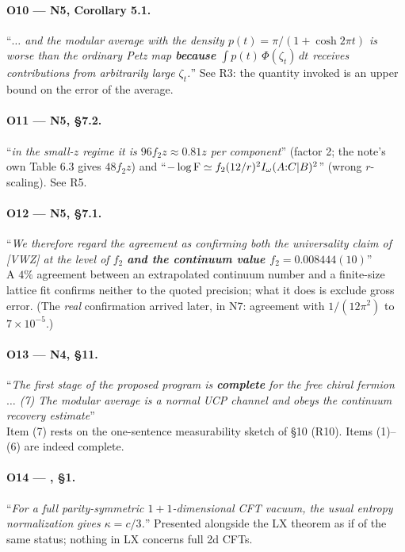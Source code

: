 \documentclass[11pt]{article}
\newcommand{\NIV}{N4}\newcommand{\NV}{N5}\newcommand{\NVI}{N6}\newcommand{\NVII}{N7}
\newcommand{\zz}{\zeta}
\begin{document}
\paragraph{O10 --- \NV, Corollary 5.1. }
``\emph{$\dots$ and the modular average with the density $p(t)=\pi/(1+\cosh2\pi t)$ is worse than the ordinary Petz
map \textbf{because} $\int p(t)\,\Phi(\zz_t)\,dt$ receives contributions from arbitrarily large $\zz_t$.}''
See R3: the quantity invoked is an upper bound on the error of the average.

\paragraph{O11 --- \NV, \S7.2. }
``\emph{in the small-$z$ regime it is $96f_2z\approx0.81z$ per component}'' (factor 2; the note's own Table 6.3 gives
$48f_2z$) and ``\emph{$-\log\operatorname{F}\simeq f_2(12/r)^2I_\omega(A{:}C|B)^2$}'' (wrong $r$-scaling).  See R5.

\paragraph{O12 --- \NV, \S7.1. \normalfont[MINOR]}
``\emph{We therefore regard the agreement as confirming both the universality claim of [VWZ] at the level of $f_2$
\textbf{and the continuum value $f_2=0.008444(10)$}}''\\
A $4\%$ agreement between an extrapolated continuum number and a finite-size lattice fit confirms neither to the
quoted precision; what it does is exclude gross error.  (The \emph{real} confirmation arrived later, in \NVII: agreement
with $1/(12\pi^2)$ to $7\times10^{-5}$.)

\paragraph{O13 --- \NIV, \S11. \normalfont[MINOR]}
``\emph{The first stage of the proposed program is \textbf{complete} for the free chiral fermion $\dots$ (7) The
modular average is a normal UCP channel and obeys the continuum recovery estimate}''\\
Item (7) rests on the one-sentence measurability sketch of \S10 (R10).  Items (1)--(6) are indeed complete.

\paragraph{O14 --- \NIII, \S1. \normalfont[MINOR]}
``\emph{For a full parity-symmetric $1+1$-dimensional CFT vacuum, the usual entropy normalization gives $\kappa=c/3$.}''
Presented alongside the LX theorem as if of the same status; nothing in LX concerns full 2d CFTs.
\end{document}

